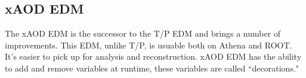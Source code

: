 \subsection{xAOD EDM}
The xAOD EDM is the successor to the T/P EDM and brings a number of improvements.
This EDM, unlike T/P, is usuable both on Athena and ROOT.
It's easier to pick up for analysis and reconstruction. 
xAOD EDM has the ability to add and remove variables at runtime, these variables are called ``decorations."